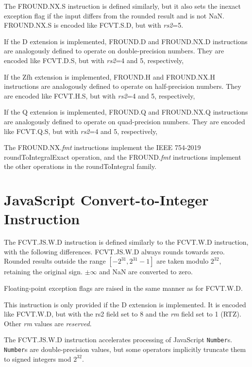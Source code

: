 The FROUND.NX.S instruction is defined similarly, but it also sets the inexact
exception flag if the input differs from the rounded result and is not NaN.
FROUND.NX.S is encoded like FCVT.S.D, but with {\em rs2}=5.

If the D extension is implemented, FROUND.D and FROUND.NX.D instructions are
analogously defined to operate on double-precision numbers.
They are encoded like FCVT.D.S, but with {\em rs2}=4 and 5, respectively,

If the Zfh extension is implemented, FROUND.H and FROUND.NX.H instructions are
analogously defined to operate on half-precision numbers.
They are encoded like FCVT.H.S, but with {\em rs2}=4 and 5, respectively,

If the Q extension is implemented, FROUND.Q and FROUND.NX.Q instructions are
analogously defined to operate on quad-precision numbers.
They are encoded like FCVT.Q.S, but with {\em rs2}=4 and 5, respectively,

\begin{commentary}
The FROUND.NX.{\em fmt} instructions implement the IEEE 754-2019
roundToIntegralExact operation, and the FROUND.{\em fmt} instructions
implement the other operations in the roundToIntegral family.
\end{commentary}


\section{JavaScript Convert-to-Integer Instruction}

The FCVT.JS.W.D instruction is defined similarly to the FCVT.W.D
instruction, with the following differences.
FCVT.JS.W.D always rounds towards zero.
Rounded results outside the range $\left[-2^{31}, 2^{31}-1\right]$
are taken modulo $2^{32}$, retaining the original sign.
$\pm\infty$ and NaN are converted to zero.

Floating-point exception flags are raised in the same manner as for FCVT.W.D.

This instruction is only provided if the D extension is implemented.
It is encoded like FCVT.W.D, but with the {\rm rs2} field set to 8
and the {\em rm} field set to 1 (RTZ).
Other {\em rm} values are {\em reserved}.

\begin{commentary}
The FCVT.JS.W.D instruction accelerates processing of JavaScript
{\tt Number}s.  {\tt Number}s are double-precision values, but some
operators implicitly truncate them to signed integers mod $2^{32}$.
\end{commentary}

